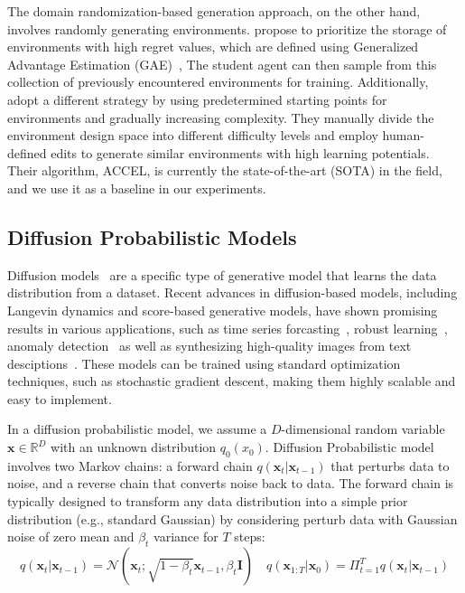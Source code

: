 \documentclass{article}
\newcommand\vx{\bm{x}}
\newcommand\mI{\bm{I}}
\newcommand\R{\mathbb{R}}
\begin{document}
The domain randomization-based generation approach, on the other hand, involves randomly generating environments. \citet{jiang2021prioritized} propose to prioritize the storage of environments with high regret values, which are defined using Generalized Advantage Estimation (GAE)~\citep{schulman2015high}, The student agent can then sample from this collection of previously encountered environments for training. Additionally, \citet{parker2022evolving} adopt a different strategy by using predetermined starting points for environments and gradually increasing complexity. They manually divide the environment design space into different difficulty levels and employ human-defined edits to generate similar environments with high learning potentials. Their algorithm, ACCEL, is currently the state-of-the-art (SOTA) in the field, and we use it as a baseline in our experiments.

\subsection{Diffusion Probabilistic Models}\label{subsec:diff}

Diffusion models~\citep{sohl2015deep, ho2020denoising} are a specific type of generative model that learns the data distribution from a dataset. Recent advances in diffusion-based models, including Langevin dynamics and score-based generative models, have shown promising results in various applications, such as time series forcasting~\citep{tashiro2021csdi}, robust learning~\citep{nie2022diffusion}, anomaly detection~\citep{wyatt2022anoddpm} as well as synthesizing high-quality images from text desciptions~\citep{nichol2021glide,saharia2022photorealistic}. These models can be trained using standard optimization techniques, such as stochastic gradient descent, making them highly scalable and easy to implement.

In a diffusion probabilistic model, we assume a $D$-dimensional random variable $\vx \in \R^D$ with an unknown distribution $q_0(x_0)$. Diffusion Probabilistic model involves two Markov chains: a forward chain $\displaystyle q(\vx_t|\vx_{t-1})$ that perturbs data to noise, and a reverse chain that converts noise back to data. The forward chain is typically designed to transform any data distribution into a simple prior distribution (e.g., standard Gaussian) by considering perturb data with Gaussian noise of zero mean and $\beta_t$ variance for $T$ steps:
\begin{equation*}
    q(\vx_t|\vx_{t-1}) =  \mathcal{N} ( \vx_t ; \sqrt{1-\beta_t}\vx_{t-1} , \beta_t \mI) \quad q(\vx_{1:T}|\vx_{0}) = \Pi_{t=1}^T q(\vx_t|\vx_{t-1})
\end{equation*}
\end{document}
